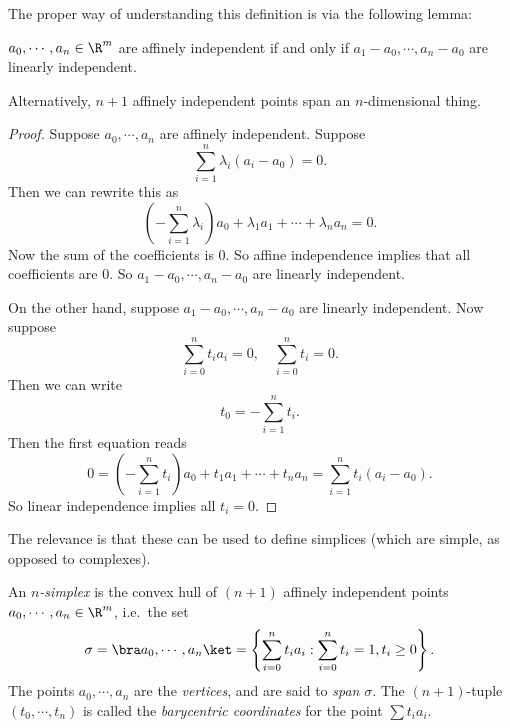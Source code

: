 \documentclass[a4paper]{article}
\begin{document}
The proper way of understanding this definition is via the following lemma:
\begin{lemma}
  $a_0, \cdots, a_n \in \R^m$ are affinely independent if and only if $a_1 - a_0, \cdots, a_n - a_0$ are linearly independent.
\end{lemma}
Alternatively, $n + 1$ affinely independent points span an $n$-dimensional thing.

\begin{proof}
  Suppose $a_0, \cdots, a_n$ are affinely independent. Suppose
  \[
    \sum_{i = 1}^n \lambda_i (a_i - a_0) = 0.
  \]
  Then we can rewrite this as
  \[
    \left(-\sum_{i = 1}^n \lambda_i\right)a_0 + \lambda_1 a_1 + \cdots + \lambda_n a_n = 0.
  \]
  Now the sum of the coefficients is $0$. So affine independence implies that all coefficients are $0$. So $a_1 - a_0, \cdots, a_n - a_0$ are linearly independent.

  On the other hand, suppose $a_1 - a_0, \cdots, a_n - a_0$ are linearly independent. Now suppose
  \[
    \sum_{i = 0}^n t_i a_i = 0,\quad \sum_{i = 0}^n t_i = 0.
  \]
  Then we can write
  \[
    t_0 = -\sum_{i = 1}^n t_i.
  \]
  Then the first equation reads
  \[
    0 = \left(-\sum_{i = 1}^n t_i \right)a_0 + t_1 a_1 + \cdots + t_n a_n = \sum_{i = 1}^n t_i (a_i - a_0).
  \]
  So linear independence implies all $t_i = 0$.
\end{proof}

The relevance is that these can be used to define simplices (which are simple, as opposed to complexes).
\begin{defi}[$n$-simplex]
  An \emph{$n$-simplex} is the convex hull of $(n + 1)$ affinely independent points $a_0, \cdots, a_n \in \R^m$, i.e.\ the set
  \[
    \sigma = \bra a_0, \cdots, a_n\ket = \left\{\sum_{i = 0}^n t_i a_i : \sum_{i = 0}^n t_i = 1,t_i \geq 0\right\}.
  \]
  The points $a_0, \cdots, a_n$ are the \emph{vertices}, and are said to \emph{span} $\sigma$. The $(n + 1)$-tuple $(t_0, \cdots, t_n)$ is called the \emph{barycentric coordinates} for the point $\sum t_i a_i$.
\end{defi}
\end{document}
